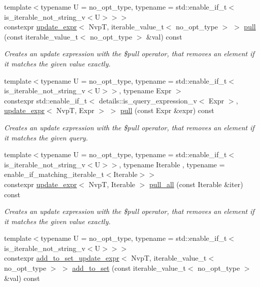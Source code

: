 \begin{DoxyCompactItemize}
{\footnotesize template$<$typename U  = no\+\_\+opt\+\_\+type, typename  = std\+::enable\+\_\+if\+\_\+t$<$is\+\_\+iterable\+\_\+not\+\_\+string\+\_\+v$<$\+U$>$$>$$>$ }\\constexpr \hyperlink{classmongo__odm_1_1update__expr}{update\+\_\+expr}$<$ NvpT, iterable\+\_\+value\+\_\+t$<$ no\+\_\+opt\+\_\+type $>$ $>$ \hyperlink{classmongo__odm_1_1nvp__base_ad690746344a15b44adaf8cfdf27fad8b}{pull} (const iterable\+\_\+value\+\_\+t$<$ no\+\_\+opt\+\_\+type $>$ \&val) const 
\begin{DoxyCompactList}\small\item\em Creates an update expression with the \$pull operator, that removes an element if it matches the given value exactly. \end{DoxyCompactList}\item 
{\footnotesize template$<$typename U  = no\+\_\+opt\+\_\+type, typename  = std\+::enable\+\_\+if\+\_\+t$<$is\+\_\+iterable\+\_\+not\+\_\+string\+\_\+v$<$\+U$>$$>$, typename Expr $>$ }\\constexpr std\+::enable\+\_\+if\+\_\+t$<$ details\+::is\+\_\+query\+\_\+expression\+\_\+v$<$ Expr $>$, \hyperlink{classmongo__odm_1_1update__expr}{update\+\_\+expr}$<$ NvpT, Expr $>$ $>$ \hyperlink{classmongo__odm_1_1nvp__base_ac9ce98f9dd1c2bd7bf9b5d1f9f100c18}{pull} (const Expr \&expr) const 
\begin{DoxyCompactList}\small\item\em Creates an update expression with the \$pull operator, that removes an element if it matches the given query. \end{DoxyCompactList}\item 
{\footnotesize template$<$typename U  = no\+\_\+opt\+\_\+type, typename  = std\+::enable\+\_\+if\+\_\+t$<$is\+\_\+iterable\+\_\+not\+\_\+string\+\_\+v$<$\+U$>$$>$, typename Iterable , typename  = enable\+\_\+if\+\_\+matching\+\_\+iterable\+\_\+t$<$\+Iterable$>$$>$ }\\constexpr \hyperlink{classmongo__odm_1_1update__expr}{update\+\_\+expr}$<$ NvpT, Iterable $>$ \hyperlink{classmongo__odm_1_1nvp__base_ab4b8cc435ea878f25cbd61a3946da316}{pull\+\_\+all} (const Iterable \&iter) const 
\begin{DoxyCompactList}\small\item\em Creates an update expression with the \$pull operator, that removes an element if it matches the given value exactly. \end{DoxyCompactList}\item 
{\footnotesize template$<$typename U  = no\+\_\+opt\+\_\+type, typename  = std\+::enable\+\_\+if\+\_\+t$<$is\+\_\+iterable\+\_\+not\+\_\+string\+\_\+v$<$\+U$>$$>$$>$ }\\constexpr \hyperlink{classmongo__odm_1_1add__to__set__update__expr}{add\+\_\+to\+\_\+set\+\_\+update\+\_\+expr}$<$ NvpT, iterable\+\_\+value\+\_\+t$<$ no\+\_\+opt\+\_\+type $>$ $>$ \hyperlink{classmongo__odm_1_1nvp__base_ab41d90f7d23d25f3e7973171c2ee0ddf}{add\+\_\+to\+\_\+set} (const iterable\+\_\+value\+\_\+t$<$ no\+\_\+opt\+\_\+type $>$ \&val) const 

\end{DoxyCompactItemize}
